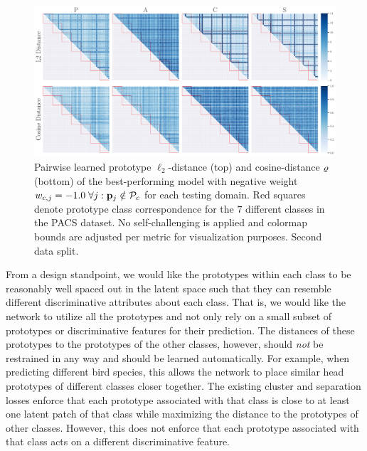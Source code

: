 \begin{figure}[t]
    \centering
    \includegraphics[width=\textwidth]{Figures/Chapter4/2021-01-21-ProDropIncorrectWeight-1.0SAVEResNet18oracle_validation_trial1.pdf}
    \caption[Second data split pairwise prototype distances with $w_{c,j} = -1.0$] {Pairwise learned prototype $\ell_2$-distance (top) and cosine-distance $\varrho$ (bottom) of the best-performing model with negative weight $w_{c,j} = -1.0\; \forall j: \mathbf{p}_{j} \notin \mathcal{P}_c$ for each testing domain. Red squares denote prototype class correspondence for the $7$ different classes in the PACS dataset. No self-challenging is applied and colormap bounds are adjusted per metric for visualization purposes. Second data split.}
    \label{fig:pw_distance_trial1}
\end{figure}

From a design standpoint, we would like the prototypes within each class to be reasonably well spaced out in the latent space such that they can resemble different discriminative attributes about each class. That is, we would like the network to utilize all the prototypes and not only rely on a small subset of prototypes or discriminative features for their prediction. The distances of these prototypes to the prototypes of the other classes, however, should \emph{not} be restrained in any way and should be learned automatically. For example, when predicting different bird species, this allows the network to place similar head prototypes of different classes closer together. The existing cluster and separation losses enforce that each prototype associated with that class is close to at least one latent patch of that class while maximizing the distance to the prototypes of other classes. However, this does not enforce that each prototype associated with that class acts on a different discriminative feature.

